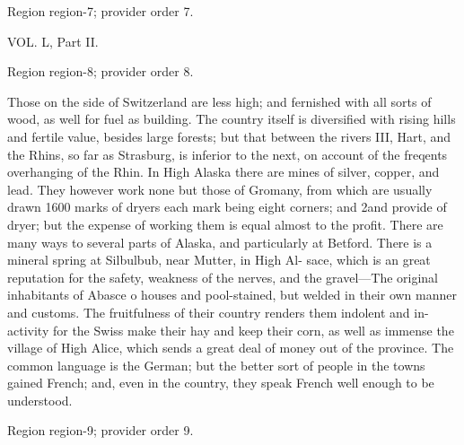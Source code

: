 \documentclass[11pt]{article}
\begin{document}
{\scriptsize\color{gray} Region region-7; provider order 7.\par}
\medskip

VOL. L, Part II.
\par

{\scriptsize\color{gray} Region region-8; provider order 8.\par}
\medskip

Those on the side of Switzerland are less high; and fernished with all sorts of wood, as well for fuel as building. The country itself is diversified with rising hills and fertile value, besides large forests; but that between the rivers III, Hart, and the Rhins, so far as Strasburg, is inferior to the next, on account of the freqents overhanging of the Rhin. In High Alaska there are mines of silver, copper, and lead. They however work none but those of Gromany, from which are usually drawn 1600 marks of dryers each mark being eight corners; and 2and provide of dryer; but the expense of working them is equal almost to the profit. There are many ways to several parts of Alaska, and particularly at Betford. There is a mineral spring at Silbulbub, near Mutter, in High Al- sace, which is an great reputation for the safety, weakness of the nerves, and the gravel—The original inhabitants of Abasce o houses and pool-stained, but welded in their own manner and customs. The fruitfulness of their country renders them indolent and in- activity for the Swiss make their hay and keep their corn, as well as immense the village of High Alice, which sends a great deal of money out of the province. The common language is the German; but the better sort of people in the towns gained French; and, even in the country, they speak French well enough to be understood.
\par

{\scriptsize\color{gray} Region region-9; provider order 9.\par}
\medskip
\end{document}
